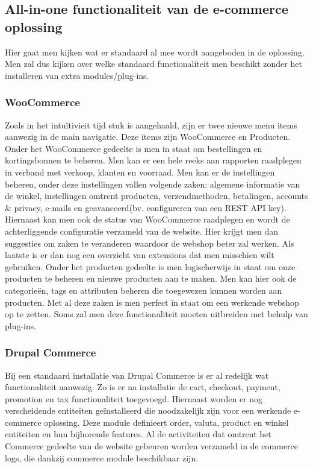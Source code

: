 \subsection{All-in-one functionaliteit van de e-commerce oplossing}
Hier gaat men kijken wat er standaard al mee wordt aangeboden in de oplossing. Men zal dus kijken over welke standaard functionaliteit men beschikt zonder het installeren van extra modules/plug-ins.
\subsubsection{WooCommerce}
Zoals in het intuïtivieit tijd stuk is aangehaald, zijn er twee nieuwe menu items aanwezig in de main navigatie. Deze items zijn WooCommerce en Producten. Onder het WooCommerce gedeelte is men in staat om bestellingen en kortingsbonnen te beheren. Men kan er een hele reeks aan rapporten raadplegen in verband met verkoop, klanten en voorraad. Men kan er de instellingen beheren, onder deze instellingen vallen volgende zaken: algemene informatie van de winkel, instellingen omtrent producten, verzendmethoden, betalingen, accounts \& privacy, e-mails en geavanceerd(bv. configureren van een REST API key). Hiernaast kan men ook de status van WooCommerce raadplegen en wordt de achterliggende configuratie verzameld van de website. Hier krijgt men dan suggesties om zaken te veranderen waardoor de webshop beter zal werken. Als laatste is er dan nog een overzicht van extensions dat men misschien wilt gebruiken. Onder het producten gedeelte is men logischerwijs in staat om onze producten te beheren en nieuwe producten aan te maken. Men kan hier ook de categorieën, tags en attributen beheren die toegewezen kunnen worden aan producten. Met al deze zaken is men perfect in staat om een werkende webshop op te zetten. Soms zal men deze functionaliteit moeten uitbreiden met behulp van plug-ins.

 
\subsubsection{Drupal Commerce}
Bij een standaard installatie van Drupal Commerce is er al redelijk wat functionaliteit aanwezig. Zo is er na installatie de cart, checkout, payment, promotion en tax functionaliteit toegevoegd. Hiernaast worden er nog verscheidende entiteiten geïnstalleerd die noodzakelijk zijn voor een werkende e-commerce oplossing. Deze module definieert order, valuta, product en winkel entiteiten en hun bijhorende features. Al de activiteiten dat omtrent het Commerce gedeelte van de website gebeuren worden verzameld in de commerce logs, die dankzij commerce module beschikbaar zijn. 

